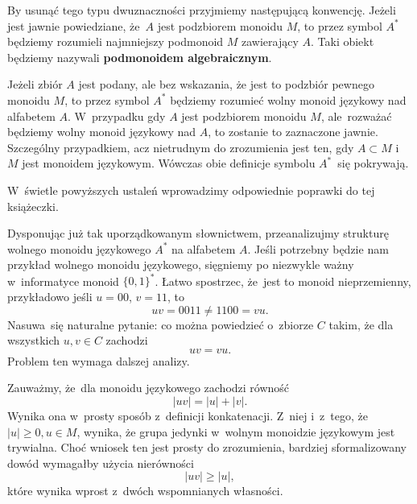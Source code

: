 \documentclass[a4paper,11pt]{article}
\begin{document}
By usunąć tego typu dwuznaczności przyjmiemy następującą konwencję.
Jeżeli jest jawnie powiedziane, że~$A$ jest podzbiorem monoidu $M$, to
przez symbol $A^{ * }$ będziemy rozumieli najmniejszy podmonoid $M$
zawierający $A$. Taki obiekt będziemy nazywali \textbf{podmonoidem
  algebraicznym}.

Jeżeli zbiór $A$ jest podany, ale bez wskazania, że
jest to podzbiór pewnego monoidu $M$, to przez symbol $A^{ * }$
będziemy rozumieć wolny monoid językowy nad alfabetem $A$. W~przypadku
gdy $A$ jest podzbiorem monoidu $M$, ale~rozważać będziemy wolny
monoid językowy nad $A$, to zostanie to zaznaczone jawnie. Szczególny
przypadkiem, acz nietrudnym do zrozumienia jest ten, gdy $A \subset M$
i~$M$ jest monoidem językowym. Wówczas obie definicje symbolu
$A^{ * }$~się pokrywają.

W~świetle powyższych ustaleń wprowadzimy odpowiednie poprawki do tej
książeczki.

\vspace{\spaceFour}





\start {} Dysponując już tak uporządkowanym słownictwem,
przeanalizujmy strukturę wolnego monoidu językowego $A^{ * }$ na
alfabetem $A$. Jeśli potrzebny będzie nam przykład wolnego monoidu
językowego, sięgniemy po niezwykle ważny w~informatyce monoid
$\{ 0, 1 \}^{ * }$. Łatwo spostrzec, że~jest to monoid nieprzemienny,
przykładowo jeśli $u = 00$, $v = 11$, to
\begin{equation}
  \label{eq:Forys-Forys-05}
  u v = 0011 \neq 1100 = vu.
\end{equation}
Nasuwa~się naturalne pytanie: co można powiedzieć o~zbiorze $C$ takim,
że dla wszystkich $u, v \in C$ zachodzi
\begin{equation}
  \label{eq:Forys-Forys-06}
  uv = vu.
\end{equation}
Problem ten wymaga dalszej analizy.

Zauważmy, że~dla monoidu językowego zachodzi równość
\begin{equation}
  \label{eq:Forys-Forys-07}
  | u v | = | u | + | v |.
\end{equation}
Wynika ona w~prosty sposób z~definicji konkatenacji. Z~niej i~z~tego,
że~$| u | \geq 0, u \in M$, wynika, że grupa jedynki w~wolnym
monoidzie językowym jest trywialna. Choć wniosek ten jest prosty do
zrozumienia, bardziej sformalizowany dowód wymagałby użycia
nierówności
\begin{equation}
  \label{eq:Forys-Forys-08}
  | u v | \geq | u |,
\end{equation}
które wynika wprost z~dwóch wspomnianych własności.
\end{document}
